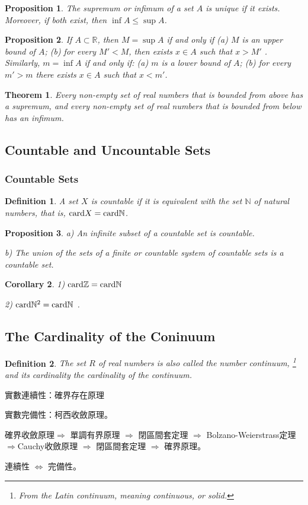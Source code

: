 \documentclass[a4paper,12pt]{article} %
\newtheorem{definition}{Definition}[section]
\newtheorem{theorem}{Theorem}[section]
\newtheorem{proposition}{Proposition}[section]
\newtheorem{corollary}[theorem]{Corollary}
\begin{document}
\begin{proposition}
    The supremum or infimum of a set $A$ is unique if it exists.
    Moreover, if both exist, then $\inf A \le \sup A$.
\end{proposition}

\begin{proposition}
    If $A \subset \mathbb{R}$, then $M = \sup A$ if and only if 
    (a) $M$ is an upper bound of $A$; (b) for every $M' < M$,
    then exists $x \in A$ such that $x > M'$ . Similarly, 
    $m = \inf A$ if and only if: (a) $m$ is a lower bound of $A$;
    (b) for every $m' > m$ there exists $x \in A$ such that $x < m'$.
\end{proposition}

\begin{theorem}
    Every non-empty set of real numbers that is bounded from
    above has a supremum, and every non-empty set of real 
    numbers that is bounded from below has an infimum.
\end{theorem}
\subsection{Countable and Uncountable Sets}
\subsubsection{Countable Sets}
\begin{definition}
    A set $X$ is countable if it is equivalent with the set $\mathbb{N}$ 
    of natural numbers, that is, ${\rm card} X = {\rm card}\mathbb{N} $.
\end{definition}

\begin{proposition}
    a) An infinite subset of a countable set is countable.

    b) The union of the sets of a finite or countable system of countable 
    sets is a countable set.
\end{proposition}

\begin{corollary}
    1) ${\rm card} \mathbb{Z} = {\rm card} \mathbb{N}$
    
    2) ${\rm card} \mathbb{N}^2 = {\rm card} \mathbb{N}$ .
\end{corollary}

\subsection{The Cardinality of the Coninuum}
\begin{definition}
    The set $R$ of real numbers is also called the number continuum, 
    \footnote{From the Latin continuum, meaning continuous, or solid.}
    and its cardinality the cardinality of the continuum.
\end{definition}

\begin{CJK*}{UTF8}{bsmi}
    實數連續性：確界存在原理

    實數完備性：柯西收斂原理。

    確界收斂原理$\Rightarrow $ 單調有界原理 $\Rightarrow$
    閉區間套定理 $\Rightarrow$ Bolzano-Weierstrass定理 $\Rightarrow $Cauchy收斂原理
    $\Rightarrow$ 閉區間套定理 $\Rightarrow$ 確界原理。
    
    連續性 $\iff$ 完備性。
\end{CJK*}
\end{document}
